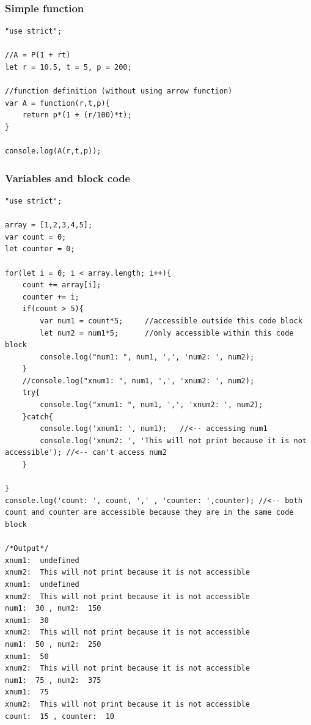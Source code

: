 \documentclass[10pt, a4paper, twocolumn]{article}
\begin{document}
\subsubsection{Simple function}

\begin{lstlisting}
"use strict";

//A = P(1 + rt)
let r = 10.5, t = 5, p = 200;

//function definition (without using arrow function)
var A = function(r,t,p){
    return p*(1 + (r/100)*t);
}

console.log(A(r,t,p));

\end{lstlisting}

\subsubsection{Variables and block code}

\begin{lstlisting}
"use strict";

array = [1,2,3,4,5];
var count = 0;
let counter = 0;

for(let i = 0; i < array.length; i++){
    count += array[i];
    counter += i;
    if(count > 5){
        var num1 = count*5;     //accessible outside this code block
        let num2 = num1*5;      //only accessible within this code block
        console.log("num1: ", num1, ',', 'num2: ', num2);
    }
    //console.log("xnum1: ", num1, ',', 'xnum2: ', num2);
    try{
        console.log("xnum1: ", num1, ',', 'xnum2: ', num2);
    }catch{
        console.log('xnum1: ', num1);   //<-- accessing num1
        console.log('xnum2: ', 'This will not print because it is not accessible'); //<-- can't access num2
    }

}
console.log('count: ', count, ',' , 'counter: ',counter); //<-- both count and counter are accessible because they are in the same code block

/*Output*/
xnum1:  undefined
xnum2:  This will not print because it is not accessible
xnum1:  undefined
xnum2:  This will not print because it is not accessible
num1:  30 , num2:  150
xnum1:  30
xnum2:  This will not print because it is not accessible
num1:  50 , num2:  250
xnum1:  50
xnum2:  This will not print because it is not accessible
num1:  75 , num2:  375
xnum1:  75
xnum2:  This will not print because it is not accessible
count:  15 , counter:  10
\end{lstlisting}
\end{document}
